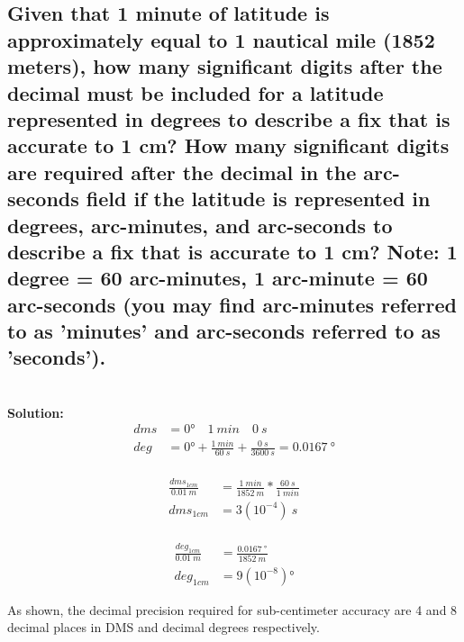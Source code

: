 \documentclass[12pt]{article}
\newcommand{\solution}{\textbf{\\Solution: \\}}
\begin{document}
  \subsection
  {
    Given that 1 minute of latitude is approximately equal 
    to 1 nautical mile (1852 meters), how many significant digits after the 
    decimal must be included for a latitude represented in degrees to 
    describe a fix that is accurate to 1 cm? How many significant digits are 
    required after the decimal in the arc-seconds field if the latitude is 
    represented in degrees, arc-minutes, and arc-seconds to describe a fix 
    that is accurate to 1 cm? Note: 1 degree = 60 arc-minutes, 1 arc-minute = 
    60 arc-seconds (you may find arc-minutes referred to as
    'minutes' and arc-seconds referred to as 'seconds').
  } 
  \begin{adjustwidth}{10mm}{0mm}
    \solution
    \begin{equation}
      \begin{split}
        dms &= 0 \si{\degree}\quad 1 \:\si{min}\quad 0 \:\si{s} \\
        deg &= 0 \si{\degree} 
                    + \frac{1 \:\si{min}}{60 \:\si{s}}
                    + \frac{0 \:\si{s}}{3600 \:\si{s}}
                    = 0.0167 \:\si{\degree}
      \end{split}
    \end{equation}
    \\
    \begin{equation}
      \begin{split}
        \frac{dms_{1cm}}{0.01 \:\si{m}} &= 
                              \frac{1 \:\si{min}}{1852 \:\si{m}} * 
                              \frac{60 \:\si{s}}{1 \:\si{min}} \\
        dms_{1cm} &= 3(10^{-4}) \:\si{s}
      \end{split}
    \end{equation}
    \\
    \begin{equation}
      \begin{split}
        \frac{deg_{1cm}}{0.01 \:\si{m}} &= 
                              \frac{0.0167 \:\si{\degree}}{1852 \:\si{m}} \\
        deg_{1cm} &= 9(10^{-8}) \si{\degree}
      \end{split}
    \end{equation}

    As shown, the decimal precision required for sub-centimeter accuracy are 4 and 
    8 decimal places in DMS and decimal degrees respectively.
  \end{adjustwidth}
\end{document}
